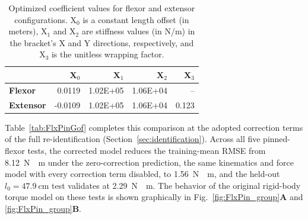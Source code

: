 \begin{table}
\caption{Optimized coefficient values for flexor and extensor configurations. $\text{X}_0$ is a constant length offset (in meters), $\text{X}_1$ and $\text{X}_2$ are stiffness values (in N/m) in the bracket's X and Y directions, respectively, and $\text{X}_3$ is the unitless wrapping factor.}
\label{tab:OptCoeff}
\fontsize{10pt}{10pt}\selectfont
\begin{tabular}{@{}lrrrr@{}}
\toprule
\textbf{}   &   $\mathbf{X}_0$     &  $\mathbf{X}_1$                   & $\mathbf{X}_2$                   & $\mathbf{X}_3$             \\ \midrule
\multicolumn{1}{l}{\textbf{Flexor}} & \multicolumn{1}{r}{0.0119} & \multicolumn{1}{r}{1.02E+05} & \multicolumn{1}{r}{1.06E+04} & \multicolumn{1}{r}{--} \\ \midrule
\textbf{Extensor}                     & -0.0109                     & 1.02E+05                      & 1.06E+04                      & 0.123                    \\ \bottomrule
\end{tabular}
\end{table}

Table~\ref{tab:FlxPinGof} completes this comparison at the adopted correction terms of the full re-identification (Section~\ref{sec:identification}). Across all five pinned-flexor tests, the corrected model reduces the training-mean RMSE from \qty{8.12}{\newton\cdot\meter} under the zero-correction prediction, the same kinematics and force model with every correction term disabled, to \qty{1.56}{\newton\cdot\meter}, and the held-out $l_{0}=\qty{47.9}{\cm}$ test validates at \qty{2.29}{\newton\cdot\meter}. The behavior of the original rigid-body torque model on these tests is shown graphically in Fig.~\ref{fig:FlxPin_group}\textbf{A} and \ref{fig:FlxPin_group}\textbf{B}.


